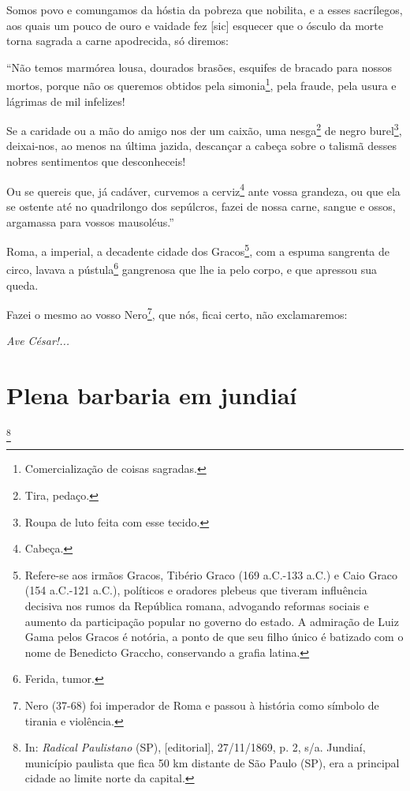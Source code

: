 Somos povo e comungamos da hóstia da pobreza que nobilita, e a esses
sacrílegos, aos quais um pouco de ouro e vaidade fez {[}sic{]} esquecer
que o ósculo da morte torna sagrada a carne apodrecida, só diremos:

``Não temos marmórea lousa, dourados brasões, esquifes de bracado para
nossos mortos, porque não os queremos obtidos pela simonia\footnote{
  Comercialização de coisas sagradas.}, pela fraude, pela usura e
lágrimas de mil infelizes!

Se a caridade ou a mão do amigo nos der um caixão, uma nesga\footnote{
  Tira, pedaço.} de negro burel\footnote{Roupa de luto feita com esse
  tecido.}, deixai-nos, ao menos na última jazida, descançar a cabeça
sobre o talismã desses nobres sentimentos que desconheceis!

Ou se quereis que, já cadáver, curvemos a cerviz\footnote{Cabeça.}
ante vossa grandeza, ou que ela se ostente até no quadrilongo dos
sepúlcros, fazei de nossa carne, sangue e ossos, argamassa para vossos
mausoléus.''

\noindent\dotfill

Roma, a imperial, a decadente cidade dos Gracos\footnote{Refere-se aos
  irmãos Gracos, Tibério Graco (169 a.C.-133 a.C.) e Caio Graco (154
  a.C.-121 a.C.), políticos e oradores plebeus que tiveram influência
  decisiva nos rumos da República romana, advogando reformas sociais e
  aumento da participação popular no governo do estado. A admiração de
  Luiz Gama pelos Gracos é notória, a ponto de que seu filho único é
  batizado com o nome de Benedicto Graccho, conservando a grafia latina.},
com a espuma sangrenta de circo, lavava a pústula\footnote{Ferida,
  tumor.} gangrenosa que lhe ia pelo corpo, e que apressou sua queda.

Fazei o mesmo ao vosso Nero\footnote{Nero (37-68) foi imperador de
  Roma e passou à história como símbolo de tirania e violência.}, que
nós, ficai certo, não exclamaremos:

\emph{Ave César!...}

\chapter{Plena barbaria em jundiaí}\footnote{In: \emph{Radical Paulistano}
  (SP), {[}editorial{]}, 27/11/1869, p. 2, s/a. Jundiaí, município
  paulista que fica 50 km distante de São Paulo (SP), era a principal
  cidade ao limite norte da capital.}

